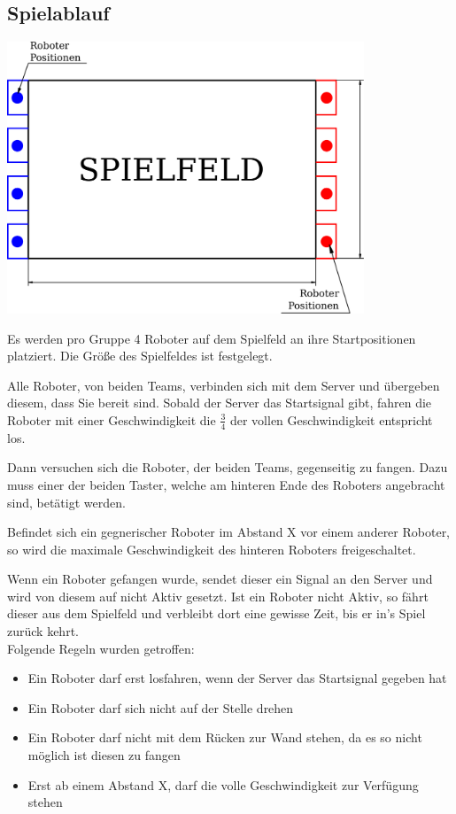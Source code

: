 \subsection{Spielablauf}
\begin{center}
	\includegraphics[width=0.8\textwidth]{Bilder/Spielfeld_2.pdf}
\end{center}
Es werden pro Gruppe 4 Roboter auf dem Spielfeld an ihre Startpositionen platziert.
Die Größe des Spielfeldes ist festgelegt.

Alle Roboter, von beiden Teams, verbinden sich mit dem Server und übergeben diesem, dass Sie bereit sind.
Sobald der Server das Startsignal gibt, fahren die Roboter mit einer Geschwindigkeit die $\frac{3}{4}$ der
vollen Geschwindigkeit entspricht los.

Dann versuchen sich die Roboter, der beiden Teams, gegenseitig zu fangen. Dazu muss einer der beiden Taster, welche am hinteren Ende des Roboters angebracht sind, betätigt werden.

Befindet sich ein gegnerischer Roboter im Abstand X vor einem anderer Roboter, so wird die maximale Geschwindigkeit des hinteren Roboters freigeschaltet.

Wenn ein Roboter gefangen wurde, sendet dieser ein Signal an den Server und wird von diesem auf nicht Aktiv gesetzt.
Ist ein Roboter nicht Aktiv, so fährt dieser aus dem Spielfeld und verbleibt dort eine gewisse Zeit, bis er in's Spiel zurück kehrt.\\
\newline
Folgende Regeln wurden getroffen:
\begin{itemize}
	\item Ein Roboter darf erst losfahren, wenn der Server das Startsignal gegeben hat
	\item Ein Roboter darf sich nicht auf der Stelle drehen
	\item Ein Roboter darf nicht mit dem Rücken zur Wand stehen, da es so nicht möglich ist diesen zu fangen 
	\item Erst ab einem Abstand X, darf die volle Geschwindigkeit zur Verfügung stehen
\end{itemize}